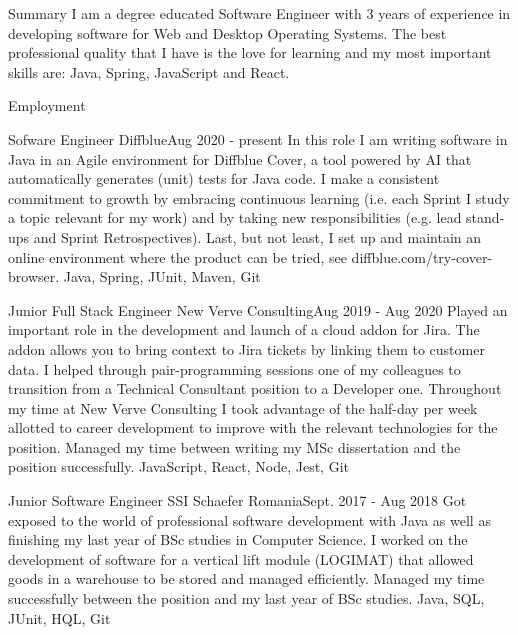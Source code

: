 \documentclass[]{mcdowellcv}
\begin{document}
	\makeheader

  \begin{cvsection}{Summary}
    I am a degree educated Software Engineer with 3 years of experience in developing software for Web and Desktop Operating Systems. The best professional quality that I have is the love for learning and my most important skills are: Java, Spring, JavaScript and React.
  \end{cvsection}
  
  \begin{cvsection}{Employment}
    \begin{cvsubsection}{Sofware Engineer }{Diffblue}{Aug 2020 - present}
      In this role I am writing software in Java in an Agile environment for Diffblue Cover, a tool powered by AI that automatically generates (unit) tests for Java code. I make a consistent commitment to growth by embracing continuous learning (i.e. each Sprint I study a topic relevant for my work) and by taking new responsibilities (e.g. lead stand-ups and Sprint Retrospectives). Last, but not least, I set up and maintain an online environment where the product can be tried, see diffblue.com/try-cover-browser.
      Java, Spring, JUnit, Maven, Git
		\end{cvsubsection}

		\begin{cvsubsection}{Junior Full Stack Engineer }{New Verve Consulting}{Aug 2019 - Aug 2020}
      Played an important role in the development and launch of a cloud addon for Jira. The addon allows you to bring context to Jira tickets by linking them to customer data. I helped through pair-programming sessions one of my colleagues to transition from a Technical Consultant position to a Developer one. Throughout my time at New Verve Consulting I took advantage of the half-day per week allotted to career development to improve with the relevant technologies for the position. Managed my time between writing my MSc dissertation and the position successfully.
      JavaScript, React, Node, Jest, Git
		\end{cvsubsection}
    
		\begin{cvsubsection}{Junior Software Engineer }{SSI Schaefer Romania}{Sept. 2017 - Aug 2018}
      Got exposed to the world of professional software development with Java as well as finishing my last year of BSc studies in Computer Science. I worked on the development of software for a vertical lift module (LOGIMAT) that allowed goods in a warehouse to be stored and managed efficiently. Managed my time successfully between the position and my last year of BSc studies.
      Java, SQL, JUnit, HQL, Git
		\end{cvsubsection}
		
  \end{cvsection}
\end{document}
